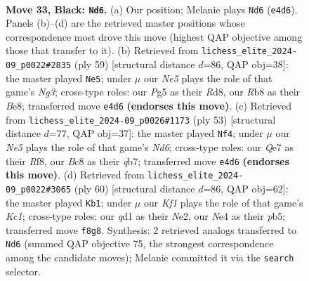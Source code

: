 \documentclass[11pt]{article}
\begin{document}
\clearpage

\begin{figure}[p]\centering
\begin{subfigure}{0.46\textwidth}\centering
\resizebox{\linewidth}{!}{%
\newchessgame
\chessboard[
  setfen={1rb2k2/1p2q2p/r7/1R4p1/N3n3/4P1P1/P4PKP/B2QR3 b - - 2 33},
  showmover=false,
  pgfstyle=straightmove, color=movearrow, markmove={e4-d6}
]}
\caption{}
\end{subfigure}\hfill
\begin{subfigure}{0.46\textwidth}\centering
\resizebox{\linewidth}{!}{%
\newchessgame
\chessboard[
  setfen={3rb2k/Qp2q1pp/2p3n1/8/4N2P/1B1P2P1/2P3P1/5RK1 b - - 0 30},
  showmover=false,
  pgfstyle=straightmove, color=movearrow, markmove={g6-e5}
]}
\caption{}
\end{subfigure}
\\[4pt]
\begin{subfigure}{0.46\textwidth}\centering
\resizebox{\linewidth}{!}{%
\newchessgame
\chessboard[
  setfen={5rk1/1Q3pp1/4p1q1/p6p/3N4/P1Nn3P/1P3PP1/5RK1 b - - 0 27},
  showmover=false,
  pgfstyle=straightmove, color=movearrow, markmove={d3-f4}
]}
\caption{}
\end{subfigure}\hfill
\begin{subfigure}{0.46\textwidth}\centering
\resizebox{\linewidth}{!}{%
\newchessgame
\chessboard[
  setfen={5r1k/6p1/p6q/1pp4r/3p1PR1/5Q1P/PPP1N3/2K4R w - - 5 31},
  showmover=false,
  pgfstyle=straightmove, color=movearrow, markmove={c1-b1}
]}
\caption{}
\end{subfigure}
\caption{\textbf{Move 33, Black: \texttt{Nd6}.} (a) Our position; Melanie plays \texttt{Nd6} (\texttt{e4d6}). Panels (b)--(d) are the retrieved master positions whose correspondence most drove this move (highest QAP objective among those that transfer to it). (b) Retrieved from \texttt{lichess\_elite\_2024-09\_p0022\#2835} (ply 59) [structural distance $d$=86, QAP obj=38]: the master played \texttt{Ne5}; under $\mu$ our \emph{Ne5} plays the role of that game's \emph{Ng3}; cross-type roles: our \emph{P}g5 as their \emph{R}d8, our \emph{R}b8 as their \emph{B}e8; transferred move \texttt{e4d6} \textbf{(endorses this move)}. (c) Retrieved from \texttt{lichess\_elite\_2024-09\_p0026\#1173} (ply 53) [structural distance $d$=77, QAP obj=37]: the master played \texttt{Nf4}; under $\mu$ our \emph{Ne5} plays the role of that game's \emph{Nd6}; cross-type roles: our \emph{Q}e7 as their \emph{R}f8, our \emph{B}c8 as their \emph{q}b7; transferred move \texttt{e4d6} \textbf{(endorses this move)}. (d) Retrieved from \texttt{lichess\_elite\_2024-09\_p0022\#3065} (ply 60) [structural distance $d$=86, QAP obj=62]: the master played \texttt{Kb1}; under $\mu$ our \emph{Kf1} plays the role of that game's \emph{Kc1}; cross-type roles: our \emph{q}d1 as their \emph{N}e2, our \emph{N}e4 as their \emph{p}b5; transferred move \texttt{f8g8}. Synthesis: 2 retrieved analogs transferred to \texttt{Nd6} (summed QAP objective 75, the strongest correspondence among the candidate moves); Melanie committed it via the \texttt{search} selector.}
\label{fig:thought-m65}
\end{figure}
\end{document}
